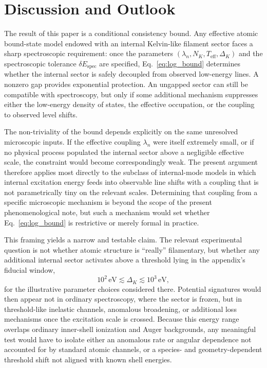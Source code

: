 \documentclass[pdflatex,sn-mathphys-num]{sn-jnl}
\begin{document}
    \section{Discussion and Outlook}\label{sec:outlook}
        The result of this paper is a conditional consistency bound. Any effective atomic bound-state model endowed with an internal Kelvin-like filament sector faces a sharp spectroscopic requirement: once the parameters $(\lambda_n,N_K,T_{\mathrm{eff}},\Delta_K)$ and the spectroscopic tolerance $\delta E_{\mathrm{spec}}$ are specified, Eq.~\eqref{eq:log_bound} determines whether the internal sector is safely decoupled from observed low-energy lines. A nonzero gap provides exponential protection. An ungapped sector can still be compatible with spectroscopy, but only if some additional mechanism suppresses either the low-energy density of states, the effective occupation, or the coupling to observed level shifts.

        The non-triviality of the bound depends explicitly on the same unresolved microscopic inputs. If the effective coupling $\lambda_n$ were itself extremely small, or if no physical process populated the internal sector above a negligible effective scale, the constraint would become correspondingly weak. The present argument therefore applies most directly to the subclass of internal-mode models in which internal excitation energy feeds into observable line shifts with a coupling that is not parametrically tiny on the relevant scales. Determining that coupling from a specific microscopic mechanism is beyond the scope of the present phenomenological note, but such a mechanism would set whether Eq.~\eqref{eq:log_bound} is restrictive or merely formal in practice.

        This framing yields a narrow and testable claim. The relevant experimental question is not whether atomic structure is ``really'' filamentary, but whether any additional internal sector activates above a threshold lying in the appendix's fiducial window,
        \begin{equation}
            10^2\,\mathrm{eV} \lesssim \Delta_K \lesssim 10^3\,\mathrm{eV},
        \end{equation}
        for the illustrative parameter choices considered there. Potential signatures would then appear not in ordinary spectroscopy, where the sector is frozen, but in threshold-like inelastic channels, anomalous broadening, or additional loss mechanisms once the excitation scale is crossed. Because this energy range overlaps ordinary inner-shell ionization and Auger backgrounds, any meaningful test would have to isolate either an anomalous rate or angular dependence not accounted for by standard atomic channels, or a species- and geometry-dependent threshold shift not aligned with known shell energies.
\end{document}
